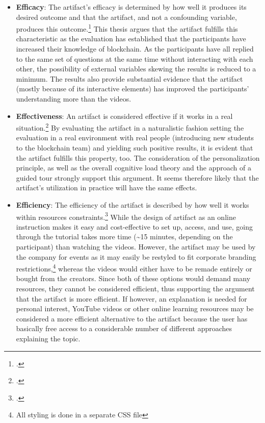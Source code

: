 \begin{itemize}
    \item \textbf{Efficacy}: The artifact's efficacy is determined by how well it produces its desired outcome and that the artifact, and not a confounding variable, produces this outcome.\footcite[Cf.][p.427]{Pries-HejeComprehensiveFrameworkEvaluation2012} This thesis argues that the artifact fulfills this characteristic as the evaluation has established that the participants have increased their knowledge of blockchain. As the participants have all replied to the same set of questions at the same time without interacting with each other, the possibility of external variables skewing the results is reduced to a minimum. The results also provide substantial evidence that the artifact (mostly because of its interactive elements) has improved the participants' understanding more than the videos.
    \item \textbf{Effectiveness}: An artifact is considered effective if it works in a real situation.\footcite[Cf.][p.428]{Pries-HejeComprehensiveFrameworkEvaluation2012} By evaluating the artifact in a naturalistic fashion setting the evaluation in a real environment with real people (introducing new students to the blockchain team) and yielding such positive results, it is evident that the artifact fulfills this property, too. The consideration of the personalization principle, as well as the overall cognitive load theory and the approach of a guided tour strongly support this argument. It seems therefore likely that the artifact's utilization in practice will have the same effects.
    \item \textbf{Efficiency}: The efficiency of the artifact is described by how well it works within resources constraints.\footcite[Cf.][p.427]{Pries-HejeComprehensiveFrameworkEvaluation2012} While the design of artifact as an online instruction makes it easy and cost-effective to set up, access, and use, going through the tutorial takes more time (\textasciitilde15 minutes, depending on the participant) than watching the videos. However, the artifact may be used by the company for events as it may easily be restyled to fit corporate branding restrictions,\footnote{All styling is done in a separate \ac{CSS} file} whereas the videos would either have to be remade entirely or bought from the creators. Since both of these options would demand many resources, they cannot be considered efficient, thus supporting the argument that the artifact is more efficient. If however, an explanation is needed for personal interest, YouTube videos or other online learning resources may be considered a more efficient alternative to the artifact because the user has basically free access to a considerable number of different approaches explaining the topic.

\end{itemize}
